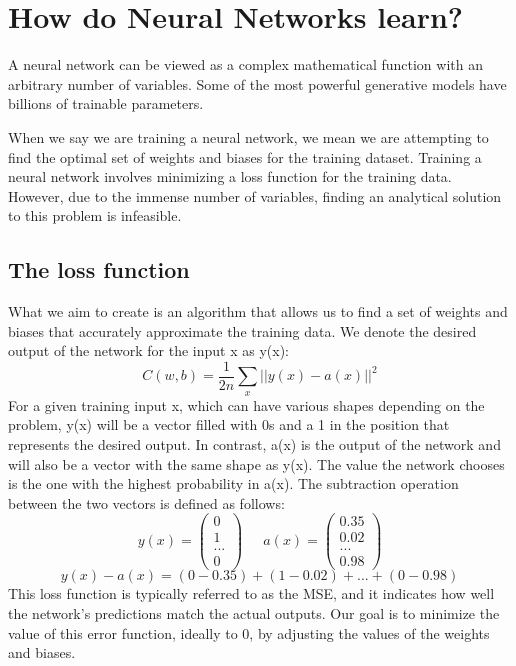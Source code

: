 \documentclass[../main]{subfiles}
\begin{document}
\chapter{How do Neural Networks learn?}

{
\hypersetup{linkcolor=black}
\renewcommand{\contentsname}{How do Neural Networks learn?}
\minitoc %
}
A neural network can be viewed as a complex mathematical function with an arbitrary number of variables. Some of the most powerful generative models have billions of trainable parameters.

When we say we are training a neural network, we mean we are attempting to find the optimal set of weights and biases for the training dataset. Training a neural network involves minimizing a loss function for the training data. However, due to the immense number of variables, finding an analytical solution to this problem is infeasible.
\section{The loss function}
What we aim to create is an algorithm that allows us to find a set of weights and biases that accurately approximate the training data. We denote the desired output of the network for the input x as y(x):
\begin{equation*}
    C(w, b) = \frac{1}{2n}\sum_{x}||y(x)-a(x)||^2
\end{equation*}
For a given training input x, which can have various shapes depending on the problem, y(x) will be a vector filled with 0s and a 1 in the position that represents the desired output. In contrast, a(x) is the output of the network and will also be a vector with the same shape as y(x). The value the network chooses is the one with the highest probability in a(x). The subtraction operation between the two vectors is defined as follows:
\begin{equation*}
    y(x) = \begin{pmatrix}
0 \\ 
1 \\ 
...       \\
0 
\end{pmatrix} \ \ \quad a(x) = \begin{pmatrix}
0.35 \\ 
0.02 \\ 
...       \\
0.98
\end{pmatrix}
\end{equation*}\vspace{1mm}
\begin{equation*}
    y(x)-a(x) = (0-0.35)+(1-0.02)+...+(0-0.98)
\end{equation*}
This loss function is typically referred to as the MSE, and it indicates how well the network's predictions match the actual outputs. Our goal is to minimize the value of this error function, ideally to 0, by adjusting the values of the weights and biases.
\end{document}
